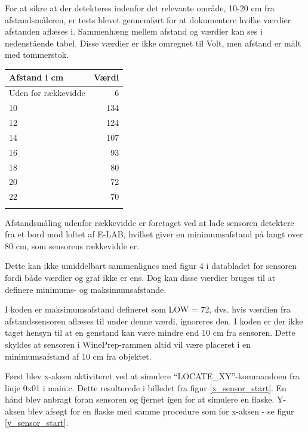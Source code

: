 For at sikre at der detekteres indenfor det relevante område, 10-20 cm fra afstandsmåleren, er tests blevet gennemført for at dokumentere hvilke værdier afstanden aflæses i. Sammenhæng mellem afstand og værdier kan ses i nedenstående tabel. Disse værdier er ikke omregnet til Volt, men afstand er målt med tommerstok.
\begin{table}[H]
\begin{tabular}{| l | r |}
	Afstand i cm & Værdi\\\hline
	Uden for rækkevidde & 6\\\hline
	10 & 134\\\hline
	12 & 124\\\hline
	14 & 107\\\hline
	16 & 93\\\hline
	18 & 80\\\hline
	20 & 72\\\hline
	22 & 70\\\hline
	\label{Afstand-vaerdier}
\end{tabular}
\end{table}

Afstandsmåling udenfor rækkevidde er foretaget ved at lade sensoren detektere fra et bord mod loftet af E-LAB, hvilket giver en minimumsafstand på langt over 80 cm, som sensorens rækkevidde er.

Dette kan ikke umiddelbart sammenlignes med figur 4 i databladet for sensoren fordi både værdier og graf ikke er ens. Dog kan disse værdier bruges til at definere minimums- og maksimumsafstande.

I koden er maksimumsafstand defineret som LOW = 72, dvs. hvis værdien fra afstandssensoren aflæses til under denne værdi, ignoreres den. I koden er der ikke taget hensyn til at en genstand kan være mindre end 10 cm fra sensoren. Dette skyldes at sensoren i WinePrep-rammen altid vil være placeret i en minimumsafstand af 10 cm fra objektet.

Først blev x-aksen aktiviteret ved at simulere ``LOCATE_XY''-kommandoen fra linje 0x01 i main.c. Dette resulterede i billedet fra figur \ref{x_sensor_start}. En hånd blev anbragt foran sensoren og fjernet igen for at simulere en flaske. Y-aksen blev afsøgt for en flaske med samme procedure som for x-aksen - se figur \ref{y_sensor_start}.

